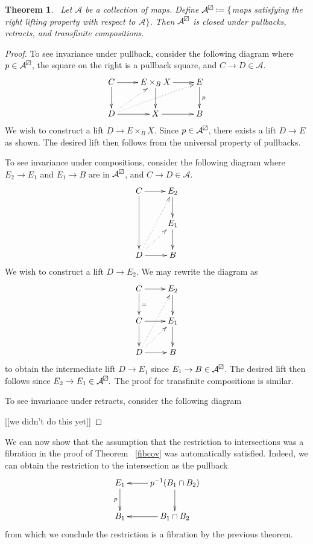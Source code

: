 \documentclass{article}
\newtheorem{theorem}{Theorem}[section]
\newtheorem{proposed work}[theorem]{Proposed Work}
\theoremstyle{definition}
\newcommand{\boxslash}{{\mathrel{
	\mathchoice{\tikz{ \draw (0,0) rectangle (6.5pt,6.5pt) -- (0,0);}} %
		{\tikz{ \draw (0,0) rectangle (6.5pt,6.5pt) -- (0,0);}} %
		{\tikz{ \draw (0,0) rectangle (5pt,5pt) -- (0,0);}} %
		{\tikz{ \draw (0,0) rectangle (5pt,5pt) -- (0,0);}} %
}}}
\newcommand{\xymat}[1]{\begin{align*}\xymatrix{ #1}\end{align*}}
\begin{document}
\begin{theorem}~\label{RLPclosed}
Let $\mathcal{A}$ be a collection of maps. Define $\mathcal{A}^\boxslash:=\lbrace$maps satisfying the right lifting property with respect to $\mathcal{A}\rbrace$. Then $\mathcal{A}^\boxslash$ is closed under pullbacks, retracts, and transfinite compositions. 
\end{theorem}

\begin{proof}
To see invariance under pullback, consider the following diagram where $p \in \mathcal{A}^\boxslash$, the square on the right is a pullback square, and $C \to D \in \mathcal{A}$.
\xymat{
C \ar[r] \ar[d] & E\times_B X \ar[d] \ar[r] &E\ar[d]^p\\ 
D \ar[r]\ar@{.>}[ur]\ar@{.>}[urr] & X\ar[r] & B} 
We wish to construct a lift $D \to E \times_B X$. Since $p \in \mathcal{A}^\boxslash$, there exists a lift $D \to E$ as shown. The desired lift then follows from the universal property of pullbacks.

To see invariance under compositions, consider the following diagram where $E_2 \to E_1$ and $E_1 \to B$ are in $\mathcal{A}^\boxslash$, and $C \to D \in \mathcal{A}$. 
\xymat{
C \ar[r]\ar[dd] & E_2 \ar[d]\\
 & E_{1}\ar[d]\\
D \ar[r] \ar@{.>}[ur]\ar@{.>}[uur] & B\\
}
We wish to construct a lift $D \to E_2$. We may rewrite the diagram as 
\xymat{
C \ar[r]\ar[d]^= & E_2 \ar[d]\\
C \ar[r]\ar[d] & E_{1}\ar[d]\\
D \ar[r] \ar@{.>}[ur]\ar@{.>}[uur] & B\\
}
to obtain the intermediate lift $D \to E_1$ since $E_1 \to B \in \mathcal{A}^\boxslash$. The desired lift then follows since $E_2 \to E_1 \in \mathcal{A}^\boxslash.$ The proof for transfinite compositions is similar.

To see invariance under retracts, consider the following diagram

[[we didn't do this yet]]

\end{proof}

We can now show that the assumption that the restriction to intersections was a fibration in the proof of Theorem ~\ref{fibcov} was automatically satisfied. Indeed, we can obtain the restriction to the intersection as the pullback 
\xymat{
E_1\ar[d]_p  & p^{-1}(B_1\cap B_2)\ar[d]\ar[l]\\
B_1 & B_1\cap B_2\ar[l]
}
from which we conclude the restriction is a fibration by the previous theorem.
\end{document}
